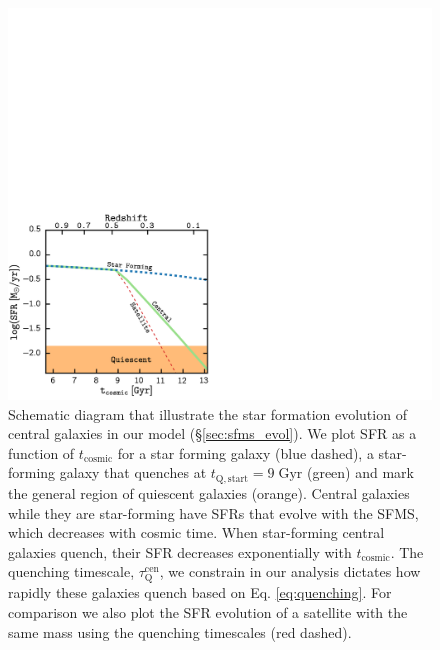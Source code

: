 \begin{figure}
\begin{center}
\includegraphics[width=\textwidth]{figs/cenq/SFH_SchematicDemo.pdf}
\caption{Schematic diagram that illustrate the star formation evolution of 
 central galaxies in our model (\S \ref{sec:sfms_evol}). 
We plot SFR as a function of $t_\mathrm{cosmic}$ for a star forming galaxy 
(blue dashed), a star-forming galaxy that quenches at 
$t_\mathrm{Q, start} = 9\;\mathrm{Gyr}$ (green) and mark the general region 
of quiescent galaxies (orange). Central galaxies while they are star-forming 
have SFRs that evolve with the SFMS, which decreases with cosmic 
time. When star-forming central galaxies quench, their SFR decreases 
exponentially with $t_\mathrm{cosmic}$. The quenching timescale, 
$\tau_\mathrm{Q}^\mathrm{cen}$, we constrain in our analysis dictates 
how rapidly these galaxies quench based on Eq. \ref{eq:quenching}. 
For comparison we also plot the SFR evolution of a satellite 
with the same mass using the \cite{Wetzel:2013aa} quenching timescales 
(red dashed).}
\label{fig:SFHdemo}
\end{center}
\end{figure}

